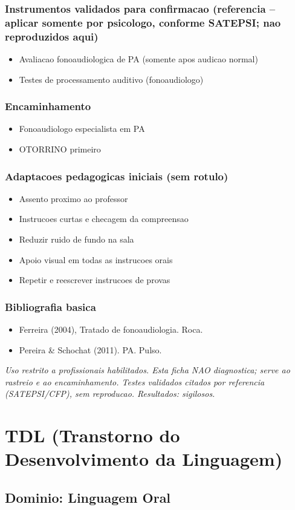 \documentclass[a4paper,11pt]{book}
\newcommand{\avisolegal}{\par\medskip\noindent\footnotesize\itshape
\color{cinza}Uso restrito a profissionais habilitados. Esta ficha NAO diagnostica;
serve ao rastreio e ao encaminhamento. Testes validados citados por referencia
(SATEPSI/CFP), sem reproducao. Resultados: sigilosos.\color{black}\par}
\begin{document}
\subsection*{Instrumentos validados para confirmacao (referencia -- aplicar somente por psicologo, conforme SATEPSI; nao reproduzidos aqui)}
\begin{itemize}
\item Avaliacao fonoaudiologica de PA (somente apos audicao normal)
\item Testes de processamento auditivo (fonoaudiologo)
\end{itemize}
\subsection*{Encaminhamento}
\begin{itemize}
\item Fonoaudiologo especialista em PA
\item OTORRINO primeiro
\end{itemize}
\subsection*{Adaptacoes pedagogicas iniciais (sem rotulo)}
\begin{itemize}
\item Assento proximo ao professor
\item Instrucoes curtas e checagem da compreensao
\item Reduzir ruido de fundo na sala
\item Apoio visual em todas as instrucoes orais
\item Repetir e reescrever instrucoes de provas
\end{itemize}
\subsection*{Bibliografia basica}
\begin{itemize}
\item Ferreira (2004), Tratado de fonoaudiologia. Roca.
\item Pereira \& Schochat (2011). PA. Pulso.
\end{itemize}
\avisolegal


\chapter{TDL (Transtorno do Desenvolvimento da Linguagem)}
\section*{Dominio: Linguagem Oral}
\end{document}
